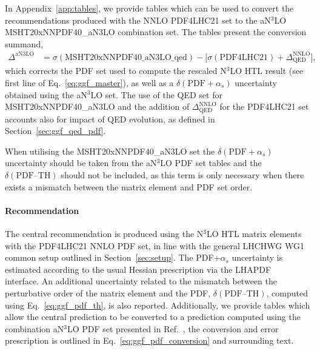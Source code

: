 In Appendix~\ref{app:tables}, we provide tables which can be used to convert the recommendations produced with the NNLO PDF4LHC21 set to the aN$^3$LO MSHT20xNNPDF40\_aN3LO combination set.
The tables present the conversion summand,
\begin{align}
\Delta^\text{aN3LO} &=
\sigma( \text{MSHT20xNNPDF40\_aN3LO\_qed}) 
-\bigl[
\sigma(\text{PDF4LHC21}) + \Delta^\text{NNLO}_\text{QED}
\bigr],
\label{eq:ggf_pdf_conversion}
\end{align}
which corrects the PDF set used to compute the rescaled N$^3$LO HTL result (see first line of Eq.~\eqref{eq:ggf_master}), as well as a $\delta(\mathrm{PDF}+\alpha_s)$ uncertainty obtained using the aN$^3$LO set.
The use of the QED set for MSHT20xNNPDF40\_aN3LO and the addition of $\Delta^\text{NNLO}_\text{QED}$ for the PDF4LHC21 set accounts also for impact of QED evolution, as defined in Section~\ref{sec:ggf_qed_pdf}.

When utilising the MSHT20xNNPDF40\_aN3LO set the $\delta(\mathrm{PDF}+\alpha_s)$ uncertainty should be taken from the aN$^3$LO PDF set tables and the $\delta(\mathrm{PDF\text{--}TH})$ should not be included, as this term is only necessary when there exists a mismatch between the matrix element and PDF set order.

\paragraph{Recommendation}
The central recommendation is produced using the N$^3$LO HTL matrix elements with the PDF4LHC21 NNLO PDF set, in line with the general LHCHWG WG1 common setup outlined in Section~\ref{sec:setup}.
The PDF+$\alpha_s$ uncertainty is estimated according to the usual Hessian prescription via the LHAPDF~\cite{Buckley:2014ana} interface.
An additional uncertainty related to the mismatch between the perturbative order of the matrix element and the PDF, $\delta(\mathrm{PDF\text{--}TH})$, computed using Eq.~\eqref{eq:ggf_pdf_th}, is also reported.
Additionally, we provide tables which allow the central prediction to be converted to a prediction computed using the combination aN$^3$LO PDF set presented in Ref.~\cite{Cridge:2024icl}, the conversion and error prescription is outlined in Eq.~\eqref{eq:ggf_pdf_conversion} and surrounding text.

